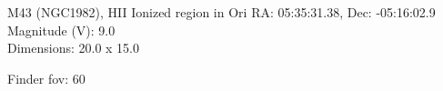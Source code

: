 \begin{block}{M43 (NGC1982), HII Ionized region in Ori}
    RA: 05:35:31.38, Dec: -05:16:02.9 \\ 
    Magnitude (V): 9.0 \\ 
    Dimensions: 20.0 x 15.0 

    Finder fov: 60 
\end{block}